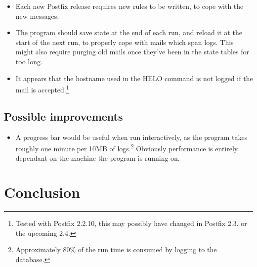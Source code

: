 \documentclass[a4paper,12pt,draft]{article}
\begin{document}
\begin{itemize}

    \item Each new Postfix release requires new rules to be written, to
        cope with the new messages.

    \item The program should save state at the end of each run, and reload
        it at the start of the next run, to properly cope with mails which
        span logs.  This might also require purging old mails once they've
        been in the state tables for too long.

    \item It appears that the hostname used in the HELO command is not
        logged if the mail is accepted.\footnote{Tested with Postfix
        2.2.10, this may possibly have changed in Postfix 2.3, or the
        upcoming 2.4.}

\end{itemize}

\subsection{Possible improvements}
\begin{itemize}

    \item A progress bar would be useful when run interactively, as the
        program takes roughly one minute per 10MB of
        logs.\footnote{Approximately 80\% of the run time is consumed by
        logging to the database.}  Obviously performance is entirely
        dependant on the machine the program is running on.

\end{itemize}

\section{Conclusion}

\appendix
\end{document}

